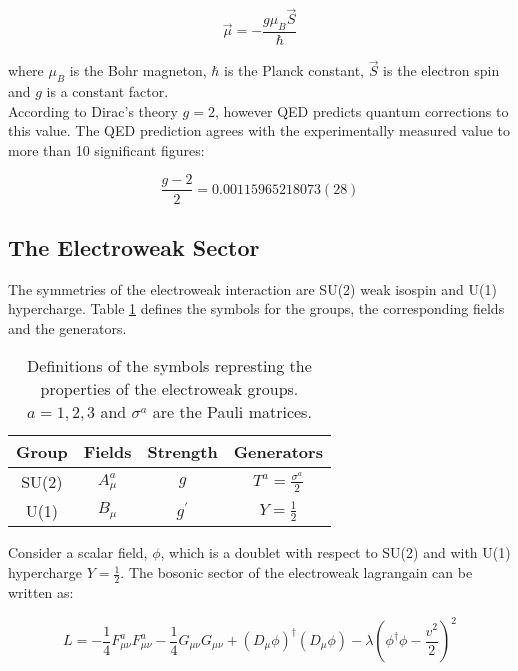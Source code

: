 \begin{equation}
\vec{\mu} = -\frac{g\mu_{B}\vec{S}}{\hbar}
\label{eq:emagmom}
\end{equation}

where $\mu_B$ is the Bohr magneton, $\hbar$ is the Planck constant, $\vec{S}$ is
the electron spin and $g$ is a constant factor. \\

According to Dirac's theory $g = 2$, however QED predicts quantum corrections to
this value. The QED prediction agrees with the experimentally measured value 
\cite{qed} to more than 10 significant figures:

\begin{equation}
\frac{g - 2}{2} = 0.00115965218073(28)
\end{equation}

\subsection{The Electroweak Sector}

The symmetries of the electroweak interaction are SU(2) weak isospin and U(1) 
hypercharge. Table \ref{tab:ewk} defines the symbols for the groups, the 
corresponding fields and the generators. \\

\begin{table}
\begin{center}
\begin{tabular}{|c|c|c|c|}
\hline
Group & Fields & Strength & Generators \\
\hline
SU(2) & $A_{\mu}^{a}$ & $g$ & $T^{a} = \frac{\sigma^{a}}{2}$ \\
U(1) & $B_{\mu}$ & $g^{\prime}$ & $Y = \frac{1}{2}$ \\
\hline
\end{tabular}
\end{center}
\caption{Definitions of the symbols represting the properties of the electroweak
groups. $a = 1, 2, 3$ and $\sigma^{a}$ are the Pauli matrices.}
\label{tab:ewk}
\end{table}

Consider a scalar field, $\phi$, which is a doublet with respect to SU(2) and 
with U(1) hypercharge $Y = \frac{1}{2}$. The bosonic sector of the electroweak 
lagrangain can be written as:

\begin{equation}
L = -\frac{1}{4}F_{\mu\nu}^{a}F_{\mu\nu}^{a}
-\frac{1}{4}G_{\mu\nu}G_{\mu\nu} + (D_{\mu}\phi)^{\dagger}(D_{\mu}\phi) -
\lambda\left(\phi^{\dagger}\phi - \frac{v^{2}}{2}\right)^{2}
\label{eq:ew}
\end{equation}

